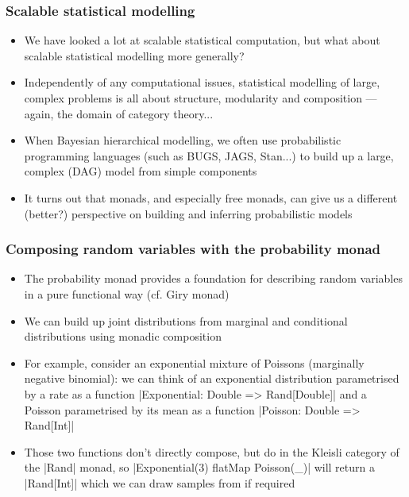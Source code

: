 \documentclass[mathserif,handout]{beamer}
\begin{document}
\begin{frame}[fragile]
  \frametitle{Scalable statistical modelling}
  \begin{itemize}
  \item We have looked a lot at scalable statistical \alert{computation}, but what about scalable statistical \alert{modelling} more generally?
  \item Independently of any computational issues, statistical modelling of large, complex problems is all about structure, modularity and composition --- again, the domain of category theory...
  \item When Bayesian hierarchical modelling, we often use \alert{probabilistic programming languages} (such as BUGS, JAGS, Stan...) to build up a large, complex (DAG) model from simple components
    \item It turns out that \alert{monads}, and especially \alert{free monads}, can give us a different (better?) perspective on building and inferring probabilistic models
  \end{itemize}
\end{frame}

\begin{frame}[fragile]
  \frametitle{Composing random variables with the probability monad}
  \begin{itemize}
  \item The \alert{probability monad} provides a foundation for describing random variables in a pure functional way (cf. \alert{Giry monad})
  \item We can build up joint distributions from marginal and conditional distributions using \alert{monadic composition}
  \item For example, consider an exponential mixture of Poissons (marginally negative binomial): we can think of an exponential distribution parametrised by a rate as a function |Exponential: Double => Rand[Double]| and a Poisson parametrised by its mean as a function |Poisson: Double => Rand[Int]|
    \item Those two functions don't directly compose, but do in the Kleisli category of the |Rand| monad, so |Exponential(3) flatMap {Poisson(_)}| will return a |Rand[Int]| which we can draw samples from if required
  \end{itemize}
\end{frame}
\end{document}
